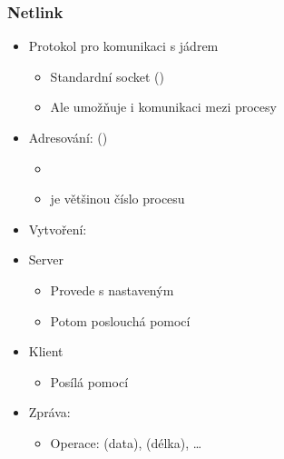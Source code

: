 \begin{frame}
  \frametitle{Netlink}

  \begin{itemize}
    \item Protokol pro komunikaci s jádrem
    \begin{itemize}
      \item Standardní socket ()
      \item Ale umožňuje i komunikaci mezi procesy
    \end{itemize}

    \pause

    \item Adresování:  ()
    \begin{itemize}
      \item {}
      \item {} je většinou číslo procesu
    \end{itemize}

    \pause

    \item Vytvoření: 

    \pause

    \item Server
    \begin{itemize}
      \item Provede  s nastaveným 
      \item Potom poslouchá pomocí 
    \end{itemize}

    \pause

    \item Klient
    \begin{itemize}
      \item Posílá pomocí 
    \end{itemize}

    \pause

    \item Zpráva: 
    \begin{itemize}
      \item Operace:  (data),  (délka),
        \dots
    \end{itemize}

  \end{itemize}

\end{frame}

